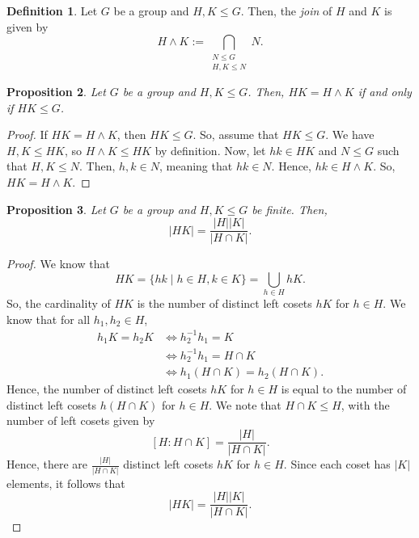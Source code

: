\documentclass[a4paper, openany]{memoir}
\theoremstyle{definition}
\newtheorem{definition}{Definition}[section]
\theoremstyle{plain}
\newtheorem{proposition}[definition]{Proposition}
\begin{document}
    \begin{definition}
        Let $G$ be a group and $H, K \leq G$. Then, the \emph{join} of $H$ and $K$ is given by
        \[H \wedge K := \bigcap_{\substack{N \leq G \\ H, K \leq N}} N.\]
    \end{definition}

    \begin{proposition}
        Let $G$ be a group and $H, K \leq G$. Then, $HK = H \wedge K$ if and only if $HK \leq G$.
    \end{proposition}
    \begin{proof}
        If $HK = H \wedge K$, then $HK \leq G$. So, assume that $HK \leq G$. We have $H, K \leq HK$, so $H \wedge K \leq HK$ by definition. Now, let $hk \in HK$ and $N \leq G$ such that $H, K \leq N$. Then, $h, k \in N$, meaning that $hk \in N$. Hence, $hk \in H \wedge K$. So, $HK = H \wedge K$.
    \end{proof}

    \begin{proposition}
        Let $G$ be a group and $H, K \leq G$ be finite. Then,
        \[|HK| = \frac{|H| |K|}{|H \cap K|}.\]
    \end{proposition}
    \begin{proof}
        We know that 
        \[HK = \{hk \mid h \in H, k \in K\} = \bigcup_{h \in H} hK.\]
        So, the cardinality of $HK$ is the number of distinct left cosets $hK$ for $h \in H$. We know that for all $h_1, h_2 \in H$,
        \begin{align*}
            h_1K = h_2K &\iff h_2^{-1}h_1 = K \\
            &\iff h_2^{-1}h_1 = H \cap K \\
            &\iff h_1(H \cap K) = h_2(H \cap K).
        \end{align*}
        Hence, the number of distinct left cosets $hK$ for $h \in H$ is equal to the number of distinct left cosets $h(H \cap K)$ for $h \in H$. We note that $H \cap K \leq H$, with the number of left cosets given by
        \[[H : H \cap K] = \frac{|H|}{|H \cap K|}.\]
        Hence, there are $\frac{|H|}{|H \cap K|}$ distinct left cosets $hK$ for $h \in H$. Since each coset has $|K|$ elements, it follows that 
        \[|HK| = \frac{|H| |K|}{|H \cap K|}.\]
    \end{proof}
    \newpage
    
\end{document}
